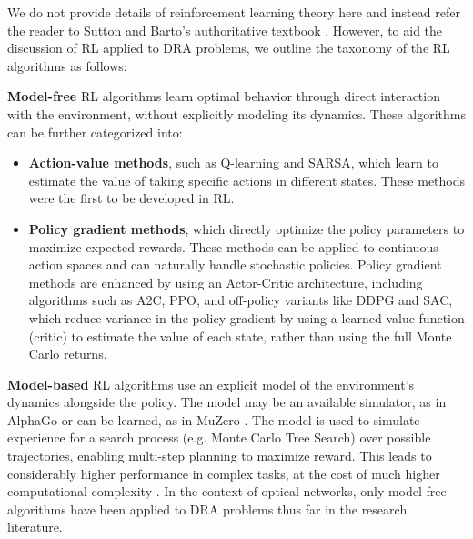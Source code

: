 We do not provide details of reinforcement learning theory here and instead refer the reader to Sutton and Barto's authoritative textbook \cite{sutton_reinforcement_2018}. However, to aid the discussion of RL applied to DRA problems, we outline the taxonomy of the RL algorithms as follows:

\textbf{Model-free} RL algorithms learn optimal behavior through direct interaction with the environment, without explicitly modeling its dynamics. These algorithms can be further categorized into:
\begin{itemize}
\item \textbf{Action-value methods}, such as Q-learning and SARSA, which learn to estimate the value of taking specific actions in different states. These methods were the first to be developed in RL.
\item \textbf{Policy gradient methods}, which directly optimize the policy parameters to maximize expected rewards. These methods can be applied to continuous action spaces and can naturally handle stochastic policies. Policy gradient methods are enhanced by using an Actor-Critic architecture, including algorithms such as A2C, PPO, and off-policy variants like DDPG and SAC, which reduce variance in the policy gradient by using a learned value function (critic) to estimate the value of each state, rather than using the full Monte Carlo returns.

\end{itemize}
\textbf{Model-based} RL algorithms use an explicit model of the environment's dynamics alongside the policy. The model may be an available simulator, as in AlphaGo \cite{silver_mastering_2016} or can be learned, as in MuZero \cite{silver_general_2018}. The model is used to simulate experience for a search process (e.g. Monte Carlo Tree Search) over possible trajectories, enabling multi-step planning to maximize reward. This leads to considerably higher performance in complex tasks, at the cost of much higher computational complexity \cite{brown_superhuman_2019}.
In the context of optical networks, only model-free algorithms have been applied to DRA problems thus far in the research literature.



